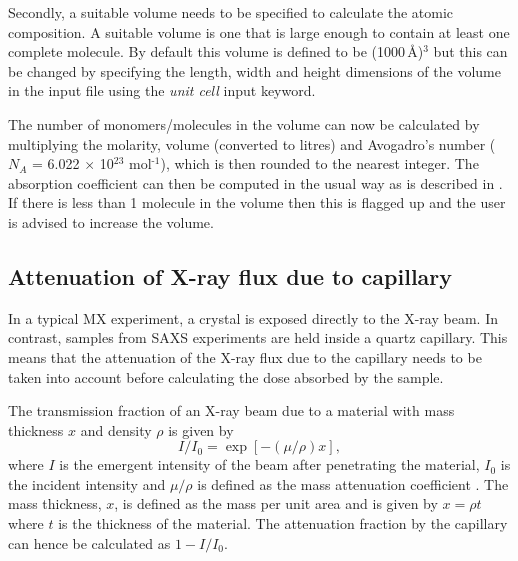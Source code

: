 Secondly, a suitable volume needs to be specified to calculate the atomic composition.
A suitable volume is one that is large enough to contain at least one complete molecule.
By default this volume is defined to be (1000$\,$\AA)$^\text{3}$ but this can be changed by specifying the length, width and height dimensions of the volume in the input file using the \textit{unit cell} input keyword.

The number of monomers/molecules in the volume can now be calculated by multiplying the molarity, volume (converted to litres) and Avogadro's number ($N_A$ = 6.022 $\times$ 10$^{\text{23}}$ mol$^{\text{-1}}$), which is then rounded to the nearest integer.
The absorption coefficient can then be computed in the usual way as is described in \cite{pait2009}.
If there is less than 1 molecule in the volume then this is flagged up and the user is advised to increase the volume.

\subsection{Attenuation of X-ray flux due to capillary}
\label{sub:Attenuation of X-ray flux due to capillary}
In a typical MX experiment, a crystal is exposed directly to the X-ray beam.
In contrast, samples from SAXS experiments are held inside a quartz capillary.
This means that the attenuation of the X-ray flux due to the capillary needs to be taken into account before calculating the dose absorbed by the sample.

The transmission fraction of an X-ray beam due to a material with mass thickness $x$ and density $\rho$ is given by
\begin{equation}
    I/I_0 = \exp \left[ -(\mu/\rho)x\right],
    \label{eq:capillary transmission fraction}
\end{equation}
where $I$ is the emergent intensity of the beam after penetrating the material, $I_0$ is the incident intensity and $\mu/\rho$ is defined as the mass attenuation coefficient \cite{hubbell1995tables}.
The mass thickness, $x$, is defined as the mass per unit area and is given by $x = \rho t$ where $t$ is the thickness of the material.
The attenuation fraction by the capillary can hence be calculated as $1 - I/I_0$.

